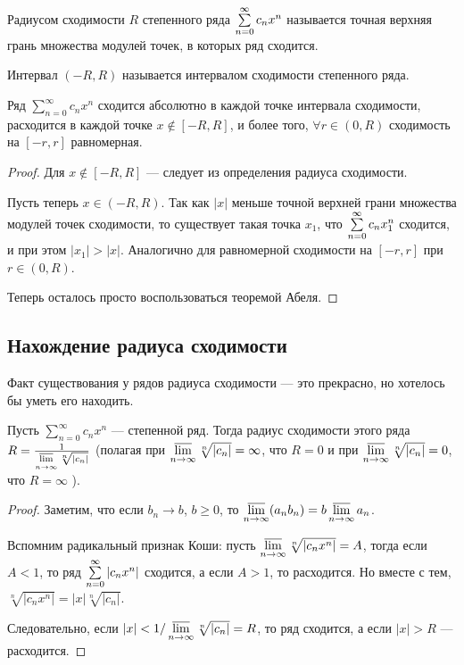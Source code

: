 \documentclass[a4paper, 12pt]{article}
\begin{document}
\begin{Def}
	Радиусом сходимости $R$ степенного ряда $\sum\limits_{n=0}^{\infty} c_nx^n$ называется точная верхняя грань множества модулей точек, в которых ряд сходится.
\end{Def}

\begin{Def}
Интервал $(-R, R)$ называется интервалом сходимости степенного ряда.
\end{Def}

\begin{Consequence}
	Ряд  $\sum\limits_{n = 0}^{\infty}c_n x^n$ сходится абсолютно в каждой точке интервала сходимости, расходится в каждой точке $x \not\in [-R, R]$, и более того, $\forall r \in (0, R)$ сходимость на $[-r, r]$ равномерная.
\end{Consequence}
\begin{proof}
Для $x \not \in [-R, R]$ --- следует из определения радиуса сходимости.

Пусть теперь $x \in (-R, R)$. Так как $|x|$ меньше точной верхней грани множества модулей точек сходимости, то существует такая точка $x_1$, что $\sum\limits_{n=0}^{\infty} c_nx_1^n$ сходится, и при этом $|x_1| > |x|$. Аналогично для равномерной сходимости на $[-r, r]$  при $r \in (0, R)$.

Теперь осталось просто воспользоваться теоремой Абеля.
\end{proof}

\subsection{Нахождение радиуса сходимости}

Факт существования у рядов радиуса сходимости --- это прекрасно, но хотелось бы уметь его находить.


\begin{Theorem} 
	Пусть $\sum\limits_{n = 0}^{\infty}c_n x^n$  --- степенной ряд. Тогда радиус сходимости этого ряда $R= \frac{1}{\varlimsup\limits_{n \to \infty} \sqrt[n]{|c_n|}}$ (полагая при $\varlimsup\limits_{n \to \infty} \sqrt[n]{|c_n|} = \infty$, что $R = 0$ и при $\varlimsup\limits_{n \to \infty} \sqrt[n]{|c_n|} = 0$, что $R = \infty$ ).
\end{Theorem}
\begin{proof}
	Заметим, что если $b_n \to b$, $b \geq 0$, то $\varlimsup\limits_{n \to \infty} (a_nb_n) = b\varlimsup\limits_{n \to \infty} a_n$.
	
	Вспомним радикальный признак Коши: пусть $\varlimsup\limits_{n \to \infty} \sqrt[n]{|c_nx^n|} = A$, тогда если $A < 1$, то ряд $\sum\limits_{n=0}^{\infty} |c_nx^n|$ сходится, а если $A > 1$, то расходится. Но вместе с тем, $\sqrt[n]{|c_nx^n|} = |x|\sqrt[n]{|c_n|}$.
	
	Следовательно, если $|x| < 1 / \varlimsup\limits_{n \to \infty} \sqrt[n]{|c_n|} = R$, то ряд сходится, а если $|x| > R$ --- расходится.
\end{proof}
\end{document}
